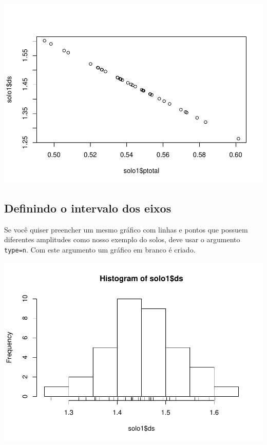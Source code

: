 \documentclass[
]{book}
\newenvironment{Shaded}{\begin{snugshade}}{\end{snugshade}}
\newcommand{\DataTypeTok}[1]{\textcolor[rgb]{0.13,0.29,0.53}{#1}}
\newcommand{\DecValTok}[1]{\textcolor[rgb]{0.00,0.00,0.81}{#1}}
\newcommand{\FloatTok}[1]{\textcolor[rgb]{0.00,0.00,0.81}{#1}}
\newcommand{\KeywordTok}[1]{\textcolor[rgb]{0.13,0.29,0.53}{\textbf{#1}}}
\newcommand{\NormalTok}[1]{#1}
\newcommand{\OperatorTok}[1]{\textcolor[rgb]{0.81,0.36,0.00}{\textbf{#1}}}
\newcommand{\StringTok}[1]{\textcolor[rgb]{0.31,0.60,0.02}{#1}}
\begin{document}
\includegraphics{TudodoR_files/figure-latex/unnamed-chunk-166-1.pdf}

\hypertarget{definindo-o-intervalo-dos-eixos}{%
\subsection{Definindo o intervalo dos eixos}\label{definindo-o-intervalo-dos-eixos}}

Se você quiser preencher um mesmo gráfico com linhas e pontos que possuem diferentes amplitudes como nosso exemplo do solos, deve usar o argumento \texttt{type=n}. Com este argumento um gráfico em branco é criado.

\begin{Shaded}
\end{Shaded}

\includegraphics{TudodoR_files/figure-latex/unnamed-chunk-167-1.pdf}
\end{document}
